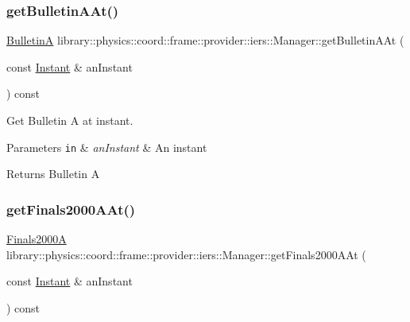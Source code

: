 \subsubsection{\texorpdfstring{get\+Bulletin\+A\+At()}{getBulletinAAt()}}
{\footnotesize\ttfamily \hyperlink{classlibrary_1_1physics_1_1coord_1_1frame_1_1provider_1_1iers_1_1_bulletin_a}{BulletinA} library\+::physics\+::coord\+::frame\+::provider\+::iers\+::\+Manager\+::get\+Bulletin\+A\+At (\begin{DoxyParamCaption}\item[{const \hyperlink{classlibrary_1_1physics_1_1time_1_1_instant}{Instant} \&}]{an\+Instant }\end{DoxyParamCaption}) const}



Get Bulletin A at instant. 


\begin{DoxyParams}[1]{Parameters}
\mbox{\tt in}  & {\em an\+Instant} & An instant \\
\hline
\end{DoxyParams}
\begin{DoxyReturn}{Returns}
Bulletin A 
\end{DoxyReturn}
\mbox{\label{classlibrary_1_1physics_1_1coord_1_1frame_1_1provider_1_1iers_1_1_manager_a7e419906c184e80e78b1538c929b9fc1}} 
\subsubsection{\texorpdfstring{get\+Finals2000\+A\+At()}{getFinals2000AAt()}}
{\footnotesize\ttfamily \hyperlink{classlibrary_1_1physics_1_1coord_1_1frame_1_1provider_1_1iers_1_1_finals2000_a}{Finals2000A} library\+::physics\+::coord\+::frame\+::provider\+::iers\+::\+Manager\+::get\+Finals2000\+A\+At (\begin{DoxyParamCaption}\item[{const \hyperlink{classlibrary_1_1physics_1_1time_1_1_instant}{Instant} \&}]{an\+Instant }\end{DoxyParamCaption}) const}



